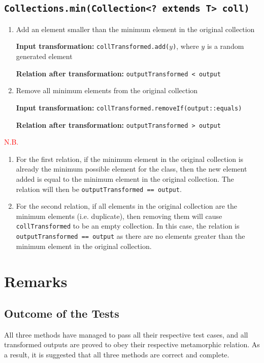 \documentclass[12pt, a4paper]{article}
\begin{document}
\subsection{\texttt{Collections.min(Collection<? extends T> coll)}}
\begin{enumerate}
  \item Add an element smaller than the minimum element in the original collection
  \par\quad\textbf{Input transformation:} \texttt{collTransformed.add($y$)}, where $y$ is a random
  generated element
  \par\quad\textbf{Relation after transformation:} \texttt{outputTransformed < output}

  \item Remove all minimum elements from the original collection
  \par\quad\textbf{Input transformation:} \texttt{collTransformed.removeIf(output::equals)}
  \par\quad\textbf{Relation after transformation:} \texttt{outputTransformed > output}
\end{enumerate}

\noindent\textcolor{red}{N.B.}
\begin{enumerate}
  \item For the first relation, if the minimum element in the original collection is already the
  minimum possible element for the class, then the new element added is equal to the minimum element
  in the original collection. The relation will then be \texttt{outputTransformed == output}.
  \item For the second relation, if all elements in the original collection are the minimum elements
  (i.e. duplicate), then removing them will cause \texttt{collTransformed} to be an empty
  collection. In this case, the relation is \texttt{outputTransformed == output} as there are no
  elements greater than the minimum element in the original collection.
\end{enumerate}

\section{Remarks}
\subsection{Outcome of the Tests}
All three methods have managed to pass all their respective test cases, and all transformed outputs
are proved to obey their respective metamorphic relation. As a result, it is suggested that all
three methods are correct and complete.
\end{document}
